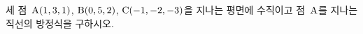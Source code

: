 세 점~$\mathrm{A}(1{,}\mkern3mu\mathopen{}3{,}\mkern3mu\mathopen{}1)$, $\mathrm{B}(0{,}\mkern3mu\mathopen{}5{,}\mkern3mu\mathopen{}2)$, $\mathrm{C}(-1{,}\mkern3mu\mathopen{}-2{,}\mkern3mu\mathopen{}-3)$을 지나는 평면에 수직이고 점~$\mathrm{A}$를 지나는 직선의 방정식을 구하시오.
